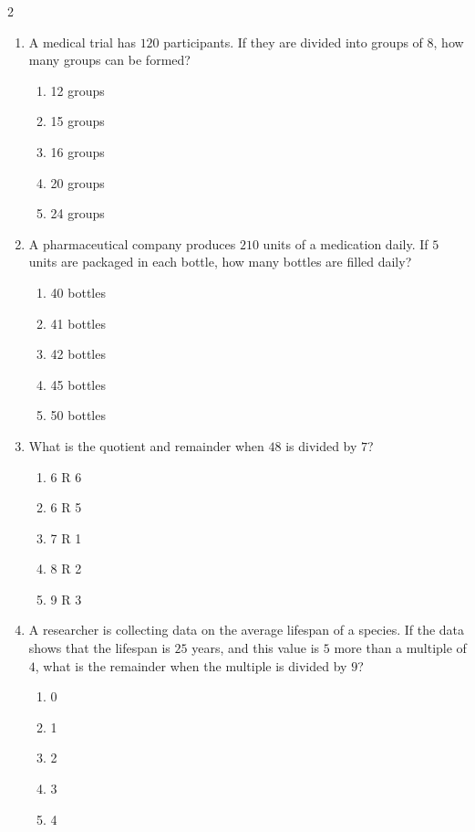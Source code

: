 \documentclass[10pt]{article}
\begin{document}
\begin{multicols}{2}
\begin{enumerate}[label=\textbf{Q\arabic*.}, leftmargin=*, itemsep=6pt, parsep=0pt]
  \item \small A medical trial has $120$ participants. If they are divided into groups of $8$, how many groups can be formed?
  \begin{enumerate}[label=(\Alph*), leftmargin=0.6cm, nosep, itemsep=2pt]
    \item 12 groups
    \item 15 groups
    \item 16 groups
    \item 20 groups
    \item 24 groups
  \end{enumerate}

  \item \small A pharmaceutical company produces $210$ units of a medication daily. If $5$ units are packaged in each bottle, how many bottles are filled daily?
  \begin{enumerate}[label=(\Alph*), leftmargin=0.6cm, nosep, itemsep=2pt]
    \item 40 bottles
    \item 41 bottles
    \item 42 bottles
    \item 45 bottles
    \item 50 bottles
  \end{enumerate}

  \item \small What is the quotient and remainder when $48$ is divided by $7$?
  \begin{enumerate}[label=(\Alph*), leftmargin=0.6cm, nosep, itemsep=2pt]
    \item 6 R 6
    \item 6 R 5
    \item 7 R 1
    \item 8 R 2
    \item 9 R 3
  \end{enumerate}

  \item \small A researcher is collecting data on the average lifespan of a species. If the data shows that the lifespan is $25$ years, and this value is $5$ more than a multiple of $4$, what is the remainder when the multiple is divided by $9$?
  \begin{enumerate}[label=(\Alph*), leftmargin=0.6cm, nosep, itemsep=2pt]
    \item 0
    \item 1
    \item 2
    \item 3
    \item 4
  \end{enumerate}


\end{enumerate}
\end{multicols}
\end{document}
